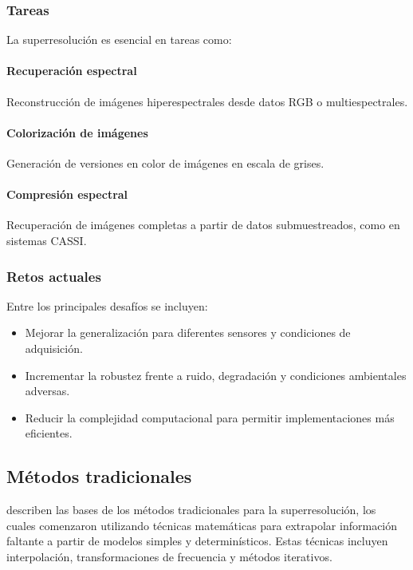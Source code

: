         \subsubsection{Tareas}
            La superresolución es esencial en tareas como:

            \paragraph{Recuperación espectral}
                Reconstrucción de imágenes hiperespectrales desde datos RGB o multiespectrales.
            \paragraph{Colorización de imágenes}
                Generación de versiones en color de imágenes en escala de grises.
            \paragraph{Compresión espectral}
                Recuperación de imágenes completas a partir de datos submuestreados, como en sistemas CASSI.


        \subsubsection{Retos actuales}
            Entre los principales desafíos se incluyen:
            \begin{itemize}
                \item Mejorar la generalización para diferentes sensores y condiciones de adquisición.
                \item Incrementar la robustez frente a ruido, degradación y condiciones ambientales adversas.
                \item Reducir la complejidad computacional para permitir implementaciones más eficientes.
            \end{itemize}

    \subsection{Métodos tradicionales}

        \textcite{rohith2021paradigm} describen las bases de los métodos tradicionales para la superresolución, los cuales comenzaron utilizando técnicas matemáticas para extrapolar información faltante a partir de modelos simples y determinísticos. Estas técnicas incluyen interpolación, transformaciones de frecuencia y métodos iterativos.
        
